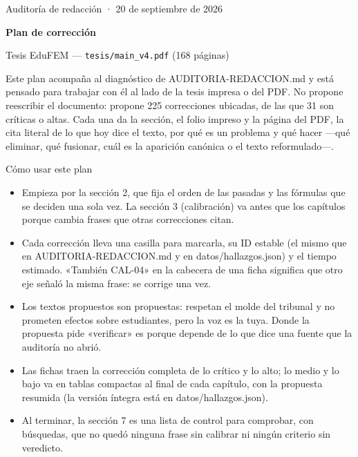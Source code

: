 

\thispagestyle{empty}
{\sffamily\color{gris}\small Auditoría de redacción · 20 de septiembre de 2026}\par\vspace{4pt}
{\sffamily\bfseries\fontsize{26}{30}\selectfont Plan de corrección}\par\vspace{4pt}
{\sffamily\Large Tesis EduFEM — \texttt{tesis/main\_v4.pdf} (168 páginas)}\par\vspace{2pt}{\color{tinta}\rule{\linewidth}{1.2pt}}\vspace{10pt}
Este plan acompaña al diagnóstico de AUDITORIA-REDACCION.md y está pensado para trabajar con él al lado de la tesis impresa o del PDF. No propone reescribir el documento: propone 225 correcciones ubicadas, de las que 31 son críticas o altas. Cada una da la sección, el folio impreso y la página del PDF, la cita literal de lo que hoy dice el texto, por qué es un problema y qué hacer —qué eliminar, qué fusionar, cuál es la aparición canónica o el texto reformulado—.
\begin{recuadro}{Cómo usar este plan}
\begin{itemize}
\item Empieza por la sección 2, que fija el orden de las pasadas y las fórmulas que se deciden una sola vez. La sección 3 (calibración) va antes que los capítulos porque cambia frases que otras correcciones citan.
\item Cada corrección lleva una casilla para marcarla, su ID estable (el mismo que en AUDITORIA-REDACCION.md y en datos/\allowbreak{}hallazgos.json) y el tiempo estimado. «También CAL-04» en la cabecera de una ficha significa que otro eje señaló la misma frase: se corrige una vez.
\item Los textos propuestos son propuestas: respetan el molde del tribunal y no prometen efectos sobre estudiantes, pero la voz es la tuya. Donde la propuesta pide «verificar» es porque depende de lo que dice una fuente que la auditoría no abrió.
\item Las fichas traen la corrección completa de lo crítico y lo alto; lo medio y lo bajo va en tablas compactas al final de cada capítulo, con la propuesta resumida (la versión íntegra está en datos/\allowbreak{}hallazgos.json).
\item Al terminar, la sección 7 es una lista de control para comprobar, con búsquedas, que no quedó ninguna frase sin calibrar ni ningún criterio sin veredicto.
\end{itemize}\end{recuadro}
{\small\tableofcontents}
\clearpage
